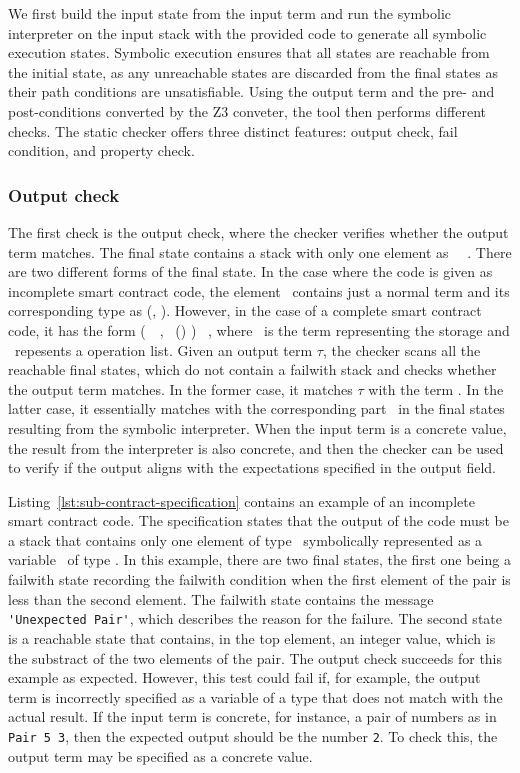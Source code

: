 \documentclass[a4paper,USenglish,cleveref, autoref,anonymous]{lipics-v2021}
\begin{document}
We first build the input state from the input term and run the
symbolic interpreter on the input stack with the provided code to
generate all symbolic execution states. Symbolic execution ensures
that all states are reachable from the initial state, as any
unreachable states are discarded from the final states as their path
conditions are unsatisfiable. Using the output term and the pre-
and post-conditions converted by the Z3 conveter, the tool then
performs different checks. The static checker offers three distinct
features: output check, fail condition, and property check. 

\subsubsection{Output check}
\label{sec:output-check}
The first check is the output check, where the checker verifies
whether the output term matches. The final state contains a stack
with only one element as \Stack\ \STACKCONCAT\ \EMPTYSTACK. There are
two different forms of the final state. In the case where the code is
given as incomplete smart contract code, the element \Stack\ contains
just a normal term and its corresponding type as (\Term,
\TY). However, in the case of a complete smart contract code, it has
the form (\PAIR\ \VOPERATIONLIST\ \VSTORAGE, \TPAIR\ (\TOPERATIONLIST)
\TYS) \STACKCONCAT\ \EMPTYSTACK, where \VSTORAGE\ is the term
representing the storage and \VOPERATIONLIST\ repesents a operation
list. Given an output term $ \tau$, the checker scans all the reachable final
states, which do not contain a failwith stack and checks whether the
output term matches. In the former case, it matches $ \tau$  with
the term \Term. In the latter case, it essentially matches with the
corresponding part \VSTORAGE\ in the final states resulting from the
symbolic interpreter. When the input term is a concrete value, the
result from the interpreter is also concrete, and then the checker can
be used to verify if the output aligns with the expectations
specified in the output field. 

Listing~\ref{lst:sub-contract-specification} contains an example of an
incomplete smart contract code. The specification states that the
output of the code must be a stack that contains only one element of
type \TINT\, symbolically represented as a variable \VZ\ of type
\TINT.  In this example, there are two final states, the first one
being a failwith state recording the failwith condition when the first
element of the pair is less than the second element. The failwith
state contains the message \lstinline|'Unexpected Pair'|, which
describes the reason for the failure. The second state is a reachable
state that contains, in the top element, an integer value, which is
the substract of the two elements of the pair. The output check succeeds for
this example as expected. However, this test could fail if, for
example, the output term is incorrectly specified as a variable of
a type that does not match with the actual result. If the input
term is concrete, for instance, a pair of numbers as in
\lstinline|Pair 5 3|, then the expected output should be the number
\lstinline|2|. To check this,  the output term may be specified as
a concrete value.
\end{document}
